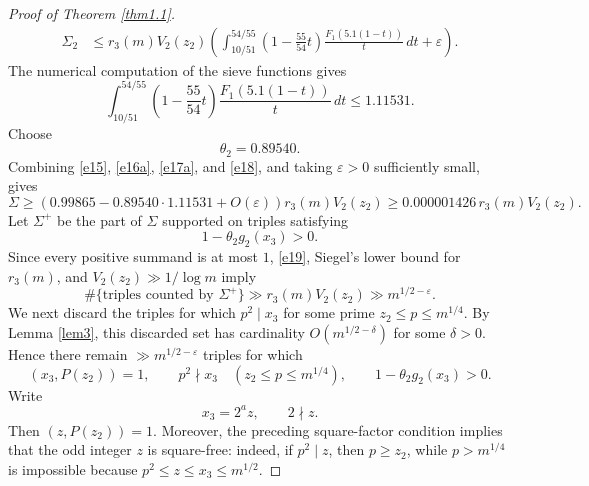 \documentclass[12pt,a4paper,reqno]{amsart}
\numberwithin{equation}{section}
\theoremstyle{plain}
\theoremstyle{definition}
\begin{document}
\begin{proof}[Proof of Theorem \ref{thm1.1}]
\begin{align}\label{e17a}
\Sigma_2
&\leq
r_3(m)V_2(z_2)
\left(
\int_{10/51}^{54/55}
\left(1-\frac{55}{54}t\right)
\frac{F_1(5.1(1-t))}{t}\,dt
+\varepsilon
\right).
\end{align}
The numerical computation of the sieve functions gives
\begin{equation}\label{e18}
\int_{10/51}^{54/55}
\left(1-\frac{55}{54}t\right)
\frac{F_1(5.1(1-t))}{t}\,dt
\leq1.11531.
\end{equation}
Choose
\[
\theta_2=0.89540.
\]
Combining \eqref{e15}, \eqref{e16a}, \eqref{e17a}, and \eqref{e18}, and taking $\varepsilon>0$ sufficiently small, gives
\begin{equation}\label{e19}
\Sigma
\geq
\left(0.99865-0.89540\cdot1.11531+O(\varepsilon)\right)r_3(m)V_2(z_2)
\geq0.000001426\,r_3(m)V_2(z_2).
\end{equation}
Let $\Sigma^+$ be the part of $\Sigma$ supported on triples satisfying
\[
1-\theta_2g_2(x_3)>0.
\]
Since every positive summand is at most $1$, \eqref{e19}, Siegel's lower bound for $r_3(m)$, and $V_2(z_2)\gg1/\log m$ imply
\begin{equation}\label{21}
\#\{\text{triples counted by }\Sigma^+\}
\gg r_3(m)V_2(z_2)
\gg m^{1/2-\varepsilon}.
\end{equation}
We next discard the triples for which $p^2\mid x_3$ for some prime $z_2\leq p\leq m^{1/4}$. By Lemma \ref{lem3}, this discarded set has cardinality $O(m^{1/2-\delta})$ for some $\delta>0$. Hence there remain $\gg m^{1/2-\varepsilon}$ triples for which
\[
(x_3,P(z_2))=1,
\qquad
p^2\nmid x_3\quad(z_2\leq p\leq m^{1/4}),
\qquad
1-\theta_2g_2(x_3)>0.
\]
Write
\[
x_3=2^az,
\qquad
2\nmid z.
\]
Then $(z,P(z_2))=1$. Moreover, the preceding square-factor condition implies that the odd integer $z$ is square-free: indeed, if $p^2\mid z$, then $p\geq z_2$, while $p>m^{1/4}$ is impossible because $p^2\leq z\leq x_3\leq m^{1/2}$.


\end{proof}
\end{document}
